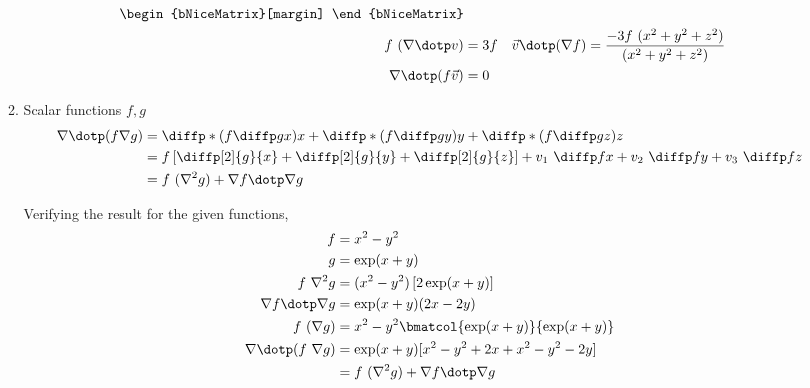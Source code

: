 \begin{enumerate}
\begin{enumerate}
\begin{align}
\begin{bNiceMatrix}[margin]
                                                     \end{bNiceMatrix}      \\
                        f\ (\nabla \dotp v)      & = 3f                            &
                        \vec{v} \dotp (\nabla f) & = \frac{-3f\ (x^2 + y^2 + z^2)}
                        {(x^2 + y^2 + z^2)}                                          \\
                        \nabla \dotp (f\vec{v})  & = 0
                    \end{align}

              \item Scalar functions $ f, g $
                    \begin{align}
                        \nabla \dotp (f \nabla g) & =
                        \diffp*{\left( f\diffp gx \right)}{x}
                        + \diffp*{\left( f\diffp gy \right)}{y}
                        + \diffp*{\left( f\diffp gz \right)}{z}                \\
                                                  & = f \left[ \diffp[2]{g}{x}
                            + \diffp[2]{g}{y}
                            + \diffp[2]{g}{z} \right] + v_1\ \diffp fx + v_2\ \diffp fy
                        + v_3\ \diffp fz                                       \\
                                                  & = f\ (\nabla^2 g)
                        + \nabla f \dotp \nabla g
                    \end{align}

                    Verifying the result for the given functions,
                    \begin{align}
                        f                          & = x^2 - y^2                \\
                        g                          & = \exp(x + y)              \\
                        f\ \nabla^2 g              & = (x^2 - y^2)
                        \left[ 2\exp(x + y)  \right]                            \\
                        \nabla f \dotp \nabla g    & = \exp(x + y)(2x - 2y)     \\
                        f\ (\nabla g)              & = x^2 - y^2
                        \bmatcol{\exp(x+y)}{\exp(x+y)}                          \\
                        \nabla \dotp (f\ \nabla g) & = \exp(x+y)[x^2 - y^2 + 2x
                        + x^2 - y^2 - 2y]                                       \\
                                                   & = f\ (\nabla^2 g)
                        + \nabla f \dotp \nabla g
                    \end{align}


\end{enumerate}
\end{enumerate}
